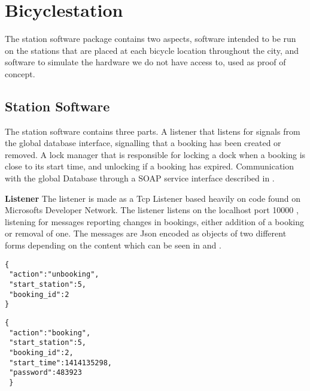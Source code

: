 \section{Bicyclestation}
The station software package contains two aspects, software intended to be run on the stations that are placed at each bicycle location throughout the city, and software to simulate the hardware we do not have access to, used as proof of concept.

\subsection{Station Software}
The station software contains three parts.
A listener that listens for signals from the global database interface, signalling that a booking has been created or removed.
A lock manager that is responsible for locking a dock when a booking is close to its start time, and unlocking if a booking has expired.
Communication with the global Database through a SOAP service interface described in .

\textbf{Listener}
The listener is made as a Tcp Listener based heavily on code found on Microsofts Developer Network\citep{misc:TcpListenerSource}. 
The listener listens on the localhost port 10000 , listening for messages reporting changes in bookings, either addition of a booking or removal of one. 
The messages are Json encoded as objects of two different forms depending on the content which can be seen in  and .


\begin{minipage}{\textwidth}
\begin{minipage}{0.45\textwidth}
\begin{lstlisting}[caption = {Unbooking message form}, label = {lst:JsonUnbooking}]
{
 "action":"unbooking",
 "start_station":5,
 "booking_id":2
}
\end{lstlisting}
\end{minipage}
\hspace{0.5cm}
\begin{minipage}{0.45\textwidth}
\begin{lstlisting}[caption = {Booking message form}, label = {lst:JsonBooking}]
{
 "action":"booking",
 "start_station":5,
 "booking_id":2,
 "start_time":1414135298,
 "password":483923
 }
\end{lstlisting}
\end{minipage}
\end{minipage}

